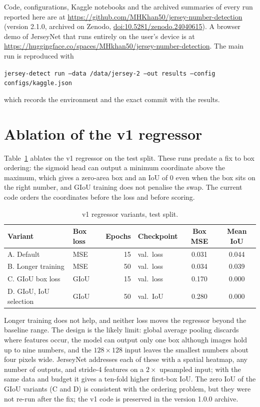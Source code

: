 \documentclass[10pt,a4paper]{article}
\begin{document}
Code, configurations, Kaggle notebooks and the archived summaries of every run reported here are
at \url{https://github.com/MHKhan50/jersey-number-detection} (version 2.1.0, archived on Zenodo,
\href{https://doi.org/10.5281/zenodo.24040615}{doi:10.5281/zenodo.24040615}). A browser demo of JerseyNet that runs entirely on the user's device is at \url{https://huggingface.co/spaces/MHkhan50/jersey-number-detection}. The main run is
reproduced with
\begin{center}
\texttt{jersey-detect run --data /data/jersey-2 --out results --config configs/kaggle.json}
\end{center}
which records the environment and the exact commit with the results.

\appendix
\section{Ablation of the v1 regressor}\label{app:v1}

Table~\ref{tab:v1} ablates the v1 regressor on the test split. These runs predate a fix to box ordering: the
sigmoid head can output a minimum coordinate above the maximum, which gives a zero-area box and an IoU of 0 even
when the box sits on the right number, and GIoU training does not penalise the swap. The current code orders the
coordinates before the loss and before scoring.

\begin{table}[t]
\centering\small
\caption{v1 regressor variants, test split.}
\label{tab:v1}
\begin{tabular}{llrlcc}
\toprule
Variant & Box loss & Epochs & Checkpoint & Box MSE & Mean IoU \\
\midrule
A. Default            & MSE  & 15 & val.\ loss & 0.031 & 0.044 \\
B. Longer training    & MSE  & 50 & val.\ loss & 0.034 & 0.039 \\
C. GIoU box loss      & GIoU & 15 & val.\ loss & 0.170 & 0.000 \\
D. GIoU, IoU selection& GIoU & 50 & val.\ IoU  & 0.280 & 0.000 \\
\bottomrule
\end{tabular}
\end{table}

Longer training does not help, and neither loss moves the regressor beyond the baseline range. The
design is the likely limit: global average pooling discards where features occur, the model can
output only one box although images hold up to nine numbers, and the $128\times128$ input leaves
the smallest numbers about four pixels wide. JerseyNet addresses each of these with a spatial
heatmap, any number of outputs, and stride-4 features on a $2\times$ upsampled input; with the same
data and budget it gives a ten-fold higher first-box IoU. The zero IoU of the GIoU variants (C and D) is
consistent with the ordering problem, but they were not re-run after the fix; the v1 code is preserved in the
version 1.0.0 archive.




\end{document}
